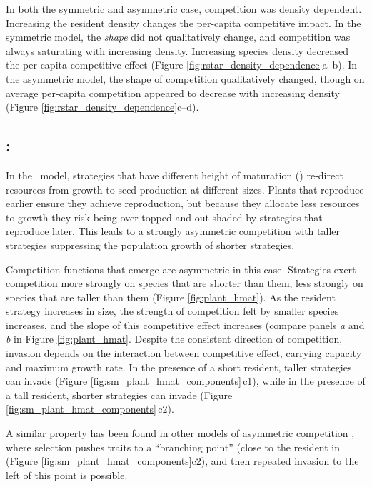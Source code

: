 \documentclass[a4paper,11pt]{article}
\begin{document}
In both the symmetric and asymmetric case, competition was density
dependent.  Increasing the resident density changes the per-capita
competitive impact.
%
In the symmetric model, the \emph{shape} did not qualitatively change,
and competition was always saturating with increasing density.
Increasing species density decreased the per-capita competitive effect
(Figure \ref{fig:rstar_density_dependence}a--b).
%
In the asymmetric model, the shape of competition qualitatively
changed, though on average per-capita competition appeared to decrease
with increasing density (Figure
\ref{fig:rstar_density_dependence}c--d).

\subsection{\plant: \hmat}

In the \plant\ model, strategies that have different height of
maturation (\hmat) re-direct resources from growth to seed production at
different sizes.  Plants that reproduce earlier ensure they achieve
reproduction, but because they allocate less resources to growth they
risk being over-topped and out-shaded by strategies that reproduce
later.  This leads to a strongly asymmetric competition with
taller strategies suppressing the population growth of shorter
strategies.

Competition functions that emerge are asymmetric in this case. Strategies exert competition more strongly on species that are shorter than
them, less strongly on species that are taller than them (Figure \ref{fig:plant_hmat}).  As the
resident strategy increases in size, the strength of competition felt
by smaller species increases, and the slope of this competitive effect
increases (compare panels \textit{a} and \textit{b} in Figure
\ref{fig:plant_hmat}.
%
Despite the consistent direction of competition, invasion depends on
the interaction between competitive effect, carrying capacity and
maximum growth rate. In the presence of a short resident, taller
strategies can invade (Figure \ref{fig:sm_plant_hmat_components}\,c1),
while in the presence of a tall resident, shorter strategies can
invade (Figure \ref{fig:sm_plant_hmat_components}\,c2).

A similar property has been found in other models of asymmetric
competition \citep[e.g.,][]{Kisdi-1999}, where selection pushes traits
to a ``branching point'' (close to the resident in (Figure
\ref{fig:sm_plant_hmat_components}c2), and then repeated invasion to
the left of this point is possible.
\end{document}
